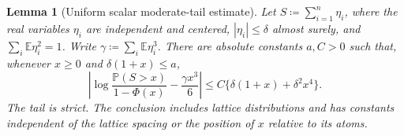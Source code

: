 \documentclass[11pt,letterpaper]{article}
\newtheorem{lemma}{Lemma}
\theoremstyle{remark}
\newcommand{\E}{\mathbb E}
\newcommand{\Pp}{\mathbb P}
\begin{document}
\begin{lemma}[Uniform scalar moderate-tail estimate]
\label{opt:moderate-tail}
Let \(S\coloneqq\sum_{i=1}^n\eta_i\), where the real variables \(\eta_i\) are
independent and centered, \(|\eta_i|\le\delta\) almost surely, and
\(\sum_i\E\eta_i^2=1\). Write
\(\gamma\coloneqq\sum_i\E\eta_i^3\). There are absolute constants \(a,C>0\)
such that, whenever \(x\ge0\) and \(\delta(1+x)\le a\),
\begin{equation}
 \left|\log\frac{\Pp(S>x)}{1-\Phi(x)}
       -\frac{\gamma x^3}{6}\right|
 \le C\{\delta(1+x)+\delta^2x^4\}.
 \label{opt:moderate-tail-formula}
\end{equation}
The tail is strict. The conclusion includes lattice distributions and
has constants independent of the lattice spacing or the position of
\(x\) relative to its atoms.
\end{lemma}
\end{document}
